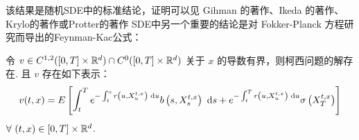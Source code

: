该结果是随机SDE中的标准结论，证明可以见 Gihman 的著作\cite{book_ref_GI}、Ikeda 的著作\cite{book_ref_NI}、Krylo的著作\cite{book_ref_NVK}或Protter的著作\cite{book_ref_PP}
SDE中另一个重要的结论是对 Fokker-Planck 方程研究而导出的Feynman-Kac公式：


\iffalse 
\begin{definition}[SDE的弱解]
	
\end{definition}

\begin{theorem}[弱解的存在唯一性]
	
\end{theorem}
\fi



\begin{theorem}
	令 $v\in C^{1,2}([0,T]\times \mathbb{R}^d) \cap C^0([0,T] \times \mathbb{R}^d)$ 关于 $x$ 的导数有界，则柯西问题的解存在. 且 $v$ 存在如下表示：
	\[
	v(t, x)=E\left[\int_{t}^{T} e^{-\int_{t}^{s} r\left(u, X_{u}^{t, x}\right) \text{ d} u} b\left(s, X_{s}^{t, x}\right) \text{ d} s+e^{-\int_{t}^{T} r\left(u, X_{u}^{t, x}\right) \text{ d} u} \sigma \left(X_{T}^{t, x}\right)\right]
	\]
	$\forall ~ (t,x) \in [0,T] \times \mathbb{R}^d$.
\end{theorem}









